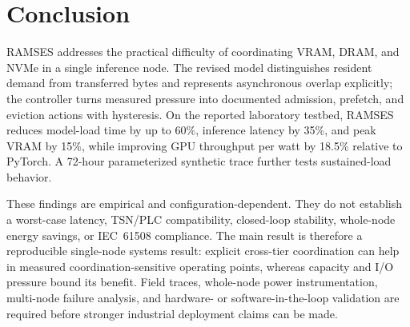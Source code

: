 \section{Conclusion}\label{sec:conclusion}
RAMSES addresses the practical difficulty of coordinating VRAM, DRAM, and NVMe in a single inference node. The revised model distinguishes resident demand from transferred bytes and represents asynchronous overlap explicitly; the controller turns measured pressure into documented admission, prefetch, and eviction actions with hysteresis. On the reported laboratory testbed, RAMSES reduces model-load time by up to 60\%, inference latency by 35\%, and peak VRAM by 15\%, while improving GPU throughput per watt by 18.5\% relative to PyTorch. A 72-hour parameterized synthetic trace further tests sustained-load behavior.

These findings are empirical and configuration-dependent. They do not establish a worst-case latency, TSN/PLC compatibility, closed-loop stability, whole-node energy savings, or IEC~61508 compliance. The main result is therefore a reproducible single-node systems result: explicit cross-tier coordination can help in measured coordination-sensitive operating points, whereas capacity and I/O pressure bound its benefit. Field traces, whole-node power instrumentation, multi-node failure analysis, and hardware- or software-in-the-loop validation are required before stronger industrial deployment claims can be made.
